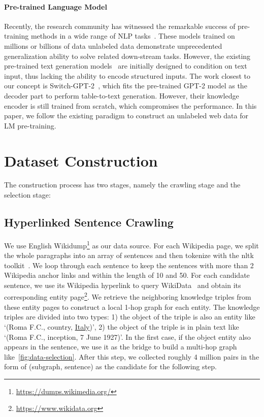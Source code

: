 \documentclass[11pt,a4paper]{article}
\begin{document}
\paragraph{Pre-trained Language Model}
Recently, the research community has witnessed the remarkable success of pre-training methods in a wide range of NLP tasks~\cite{devlin2019bert,radford2018improving,radford2019language,dai2019transformer,yang2019xlnet,liu2019roberta,keskar2019ctrl,lan2019albert,lewis2019bart,raffel2019exploring}. These models trained on millions or billions of data unlabeled data demonstrate unprecedented generalization ability to solve related down-stream tasks. However, the existing pre-trained text generation models~\cite{radford2019language,keskar2019ctrl,raffel2019exploring} are initially designed to condition on text input, thus lacking the ability to encode structured inputs. The work closest to our concept is Switch-GPT-2~\cite{chen2019few}, which fits the pre-trained GPT-2 model as the decoder part to perform table-to-text generation. However, their knowledge encoder is still trained from scratch, which compromises the performance. In this paper, we follow the existing paradigm to construct an unlabeled web data for LM pre-training. 

\section{Dataset Construction}
The construction process has two stages, namely the crawling stage and the selection stage:
\subsection{Hyperlinked Sentence Crawling}
We use English Wikidump\footnote{\url{https://dumps.wikimedia.org/}} as our data source. For each Wikipedia page, we split the whole paragraphs into an array of sentences and then tokenize with the nltk toolkit~\cite{loper2002nltk}. We loop through each sentence to keep the sentences with more than 2 Wikipedia anchor links and within the length of 10 and 50. For each candidate sentence, we use its Wikipedia hyperlink to query WikiData~\cite{vrandevcic2014wikidata} and obtain its corresponding entity page\footnote{\url{https://www.wikidata.org}}. We retrieve the neighboring knowledge triples from these entity pages to construct a local 1-hop graph for each entity. The knowledge triples are divided into two types: 1) the object of the triple is also an entity like `(Roma F.C., country, \underline{Italy})', 2) the object of the triple is in plain text like `(Roma F.C., inception, 7 June 1927)'. In the first case, if the object entity also appears in the sentence, we use it as the bridge to build a multi-hop graph like~\autoref{fig:data-selection}. After this step, we collected roughly 4 million pairs in the form of (subgraph, sentence) as the candidate for the following step.
\end{document}
